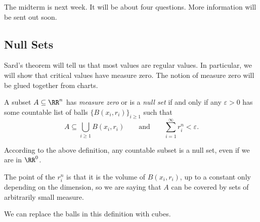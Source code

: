 \documentclass[../notes.tex]{subfiles}
\begin{document}
The midterm is next week. It will be about four questions. More information will be sent out soon.

\subsection{Null Sets}
Sard's theorem will tell us that most values are regular values. In particular, we will show that critical values have measure zero. The notion of measure zero will be glued together from charts.
\begin{definition}
	A subset $A\subseteq\RR^n$ has \textit{measure zero} or is a \textit{null set} if and only if any $\varepsilon>0$ has some countable list of balls $\{B(x_i,r_i)\}_{i\ge1}$ such that
	\[A\subseteq\bigcup_{i\ge1}B(x_i,r_i)\qquad\text{and}\qquad\sum_{i=1}^\infty r_i^n<\varepsilon.\]
\end{definition}
\begin{example}
	According to the above definition, any countable subset is a null set, even if we are in $\RR^0$.
\end{example}
The point of the $r_i^n$ is that it is the volume of $B(x_i,r_i)$, up to a constant only depending on the dimension, so we are saying that $A$ can be covered by sets of arbitrarily small measure.
\begin{remark}
	We can replace the balls in this definition with cubes.
\end{remark}
\end{document}
